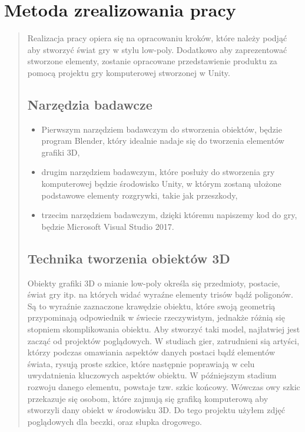 \chapter{Metoda zrealizowania pracy}
\begin{quotation}
\indent Realizacja pracy opiera się na opracowaniu kroków, które należy podjąć aby stworzyć świat gry w stylu low-poly. Dodatkowo aby zaprezentować stworzone elementy, zostanie opracowane przedstawienie produktu za pomocą projektu gry komputerowej stworzonej w Unity.
\section{Narzędzia badawcze}
\begin{itemize}
\item Pierwszym narzędziem badawczym do stworzenia obiektów, będzie program Blender, który idealnie nadaje się do tworzenia elementów grafiki 3D,

\item drugim narzędziem badawczym, które posłuży do stworzenia gry komputerowej będzie środowisko Unity, w którym zostaną ułożone podstawowe elementy rozgrywki, takie jak przeszkody,

\item trzecim narzędziem badawczym, dzięki któremu napiszemy kod do gry, będzie Microsoft Visual Studio 2017.

\end{itemize}

\section{Technika tworzenia obiektów 3D}
\indent Obiekty grafiki 3D o mianie low-poly określa się przedmioty, postacie, świat gry itp. na których widać wyraźne elementy trisów bądź poligonów. Są to wyraźnie zaznaczone krawędzie obiektu, które swoją geometrią przypominają odpowiednik w świecie rzeczywistym, jednakże różnią się stopniem skomplikowania obiektu. Aby stworzyć taki model, najłatwiej jest zacząć od projektów poglądowych. W studiach gier, zatrudnieni sią artyści, którzy podczas omawiania aspektów danych postaci bądź elementów świata, rysują proste szkice, które następnie poprawiają w celu uwydatnienia kluczowych aspektów obiektu. 
W późniejszym stadium rozwoju danego elementu, powstaje tzw. szkic końcowy. Wówczas owy szkic przekazuje się osobom, które zajmują się grafiką komputerową aby stworzyli dany obiekt w środowisku 3D. Do tego projektu użyłem zdjęć poglądowych dla beczki, oraz słupka drogowego.


\end{quotation}
